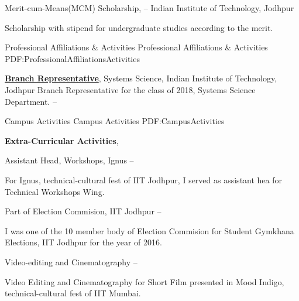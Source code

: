 \documentclass[letterpaper,MMMyyyy,nonstopmode]{simpleresumecv}
\begin{document}
\begin{Body}
\Gap
\BulletItem
Merit-cum-Means(MCM) Scholarship,
\hfill
{} --
\newline
Indian Institute of Technology, Jodhpur
\begin{Detail}
\Item
Scholarship with stipend for undergraduate studies according to the merit.
\end{Detail}


\Section
{Professional Affiliations\newline
\& Activities}
{Professional Affiliations \& Activities}
{PDF:ProfessionalAffiliationsActivities}

\Entry
\href{http://www.example.com/my-society}
{\textbf{Branch Representative}},
\newline
Systems Science, Indian Institute of Technology, Jodhpur
\Gap
\BulletItem
Branch Representative for the class of 2018, Systems Science Department.
\hfill
{} --



\Section
{Campus Activities}
{Campus Activities}
{PDF:CampusActivities}

\Entry
\textbf{Extra-Curricular Activities},

\Gap
\BulletItem
Assistant Head, Workshops, Ignus
\hfill
{} --
\begin{Detail}
\SubBulletItem
For Ignus, technical-cultural fest of IIT Jodhpur, I served as assistant hea for Technical Workshops Wing.
\end{Detail}
\Gap
\BulletItem
Part of Election Commision, IIT Jodhpur
\hfill
{} --
\begin{Detail}
\SubBulletItem
I was one of the 10 member body of Election Commision for Student Gymkhana Elections, IIT Jodhpur for the year of 2016.
\end{Detail}
\Gap
\BulletItem
Video-editing and Cinematography
\hfill
{} --
\begin{Detail}
\SubBulletItem
Video Editing and Cinematography for Short Film presented in Mood Indigo, technical-cultural fest of IIT Mumbai.
\end{Detail}




\end{Body}
\end{document}
